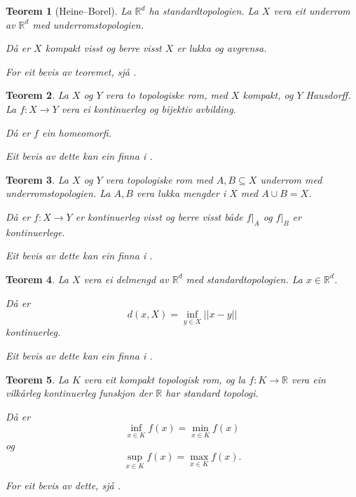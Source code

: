 \documentclass[a4paper, 12pt, norsk]{article}
\theoremstyle{plain}
\newtheorem{theorem}{Teorem}[section]
\theoremstyle{definition}
\newcommand{\Rb}{\mathbb{R}}
\newcommand{\union}{ \mathop{\cup}\limits }
\begin{document}
\begin{theorem}[Heine--Borel] \label{thm:heine-borel} 
	La \( \Rb^d \) ha standardtopologien. La \( X \) vera eit underrom av \( \Rb^d \) med underromstopologien.
	
	Då er \( X \) kompakt visst og berre visst \( X \) er lukka og avgrensa.

	For eit bevis av teoremet, sjå \cite[s. 100]{MR3932132}.
\end{theorem}

\begin{theorem} \label{thm:closed-map-lemma-og-bijektiv-lukka}
	La \( X \) og \( Y \) vera to topologiske rom, med \( X \) kompakt, og \( Y \) Hausdorff. La \( f: X \to Y \) vera ei kontinuerleg og bijektiv avbilding.

	Då er \( f \) ein homeomorfi.

	Eit bevis av dette kan ein finna i \cite[s. 135--136]{MR2548039}.
\end{theorem}

\begin{theorem} \label{thm:pasting-lemma}
	La \( X \) og \( Y \) vera topologiske rom med \( A, B \subseteq X \) underrom med underromstopologien. La \( A, B \) vera lukka mengder i \( X \) med \( A \union B = X \). 
	
	Då er \( f: X \to Y \) er kontinuerleg visst og berre visst både \( f|_A \) og \( f|_B \) er kontinuerlege.

	Eit bevis av dette kan ein finna i \cite[s. 108--109]{MR3728284}.
\end{theorem}

\begin{theorem} \label{thm:distanse-er-kont}
	La \( X \) vera ei delmengd av \( \Rb^d \) med standardtopologien. La \( x \in \Rb^d \). 
	
	Då er
	\[
		d(x, X) = \inf_{y \in X} ||x-y||
	\]
	kontinuerleg.

	Eit bevis av dette kan ein finna i \cite[s. 90--91]{MR3838450}.
\end{theorem}

\begin{theorem} \label{thm:infimum-over-kompakt-er-min} \label{thm:supremum-over-kompakt-er-maks}
	La \( K \) vera eit kompakt topologisk rom, og la \( f: K \to \Rb \) vera ein vilkårleg kontinuerleg funskjon der \( \Rb \) har standard topologi. 
	
	Då er
	\[
		\inf_{x \in K} f(x) = \min_{x \in K} f(x)
	\]
	og
	\[
		\sup_{x \in K} f(x) = \max_{x \in K} f(x).
	\]

	For eit bevis av dette, sjå \cite[s. 132]{MR2548039}.
\end{theorem}
\end{document}
